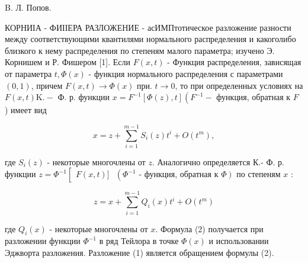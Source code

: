 \documentclass[10pt]{article}
\begin{document}
B. Л. Попов.



КОРНИІА - ФИІІЕРА РАЗЛОЖЕНИЕ - асИМПтотическое разложение разности между соответствующими квантилями нормального распределения и какоголибо близкого к нему распределения по степеням малого параметра; изучено Э. Корнишем и Р. Фишером [1]. Если $F(x, t)$ - Функция распределения, зависящая от параметра $t, \Phi(x)$ - функция нормального распределения с параметрами $(0,1)$, причем $F(x, t) \rightarrow \Phi(x)$ при. $t \rightarrow 0$, то при определенных условиях на $F(x, t) \mathrm{K} .-$ Ф. р. функции $x=F^{-1}[\Phi(z), t]\left(F^{-1}-\right.$ функция, обратная к $F$ ) имеет вид



\[

x=z+\sum_{i=1}^{m-1} S_{i}(z) t^{i}+O\left(t^{m}\right),

\]



где $S_{i}(z)$ - некоторые многочлены от $z$. Аналогично определяется К.- Ф. р. функции $z=\Phi^{-1}\left[\begin{array}{ll}F(x, t)]\end{array}\right.$ $\left(\Phi^{-1}\right.$ - функция, обратная к $\left.\Phi\right)$ по степеням $x$ :



\[

z=x+\sum_{i=1}^{m-1} Q_{i}(x) t^{i}+O\left(t^{m}\right)

\]



где $Q_{i}(x)$ - некоторые многочлены от $x$. Формула (2) получается при разложении функции $\Phi^{-1}$ в ряд Тейлора в точке $\Phi(x)$ и использовании Эджворта разложения. Разложение (1) является обращением формулы (2).
\end{document}
